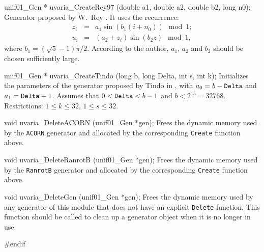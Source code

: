 unif01_Gen * uvaria_CreateRey97 (double a1, double a2, double b2, long n0);
\endcode
  \tab Generator proposed by W.\ Rey \cite{rREY98a}.
%
   It uses the recurrence:
   \begin {eqnarray}
    z_i &=& a_1 \sin (b_1 (i+n_0)) \mod 1;\\
    u_i &=& (a_2 + z_i) \sin (b_2 z) \mod 1,
   \end {eqnarray}
   where $b_1 = (\sqrt{5}-1) \pi/2$.
   According to the author, $a_1$, $a_2$ and $b_2$  should be chosen 
   sufficiently large.   
  \endtab
\code


unif01_Gen * uvaria_CreateTindo (long b, long Delta, int s, int k);
\endcode
  \tab  Initializes the parameters of the generator proposed
%
   by Tindo in \cite{rTIN90a}, with $a_0 = b - {\tt Delta}$  and
   $a_1 = {\tt Delta} + 1$.  Assumes that  $0 < {\tt Delta} < b-1$ and
   $b < 2^{15} = 32768$. 
   Restrictions: $1 \le k \le 32$, $1 \le s \le 32$.
  \endtab


\code

void uvaria_DeleteACORN (unif01_Gen *gen);
\endcode
 \tab  Frees the dynamic memory used by the {\tt ACORN}
  generator and allocated by the corresponding {\tt Create} function
  above.
 \endtab
\code


void uvaria_DeleteRanrotB (unif01_Gen *gen);
\endcode
 \tab  Frees the dynamic memory used by the {\tt RanrotB}
  generator and allocated by the corresponding {\tt Create} function
  above.
 \endtab
\code


void uvaria_DeleteGen (unif01_Gen *gen);
\endcode
 \tab  Frees the dynamic memory used by any generator of this module
  that does not have an explicit {\tt Delete} function. 
  This function should be called to clean up a generator object
  when it is no longer in use.
 \endtab

\code
\hide
#endif
\endhide
\endcode
